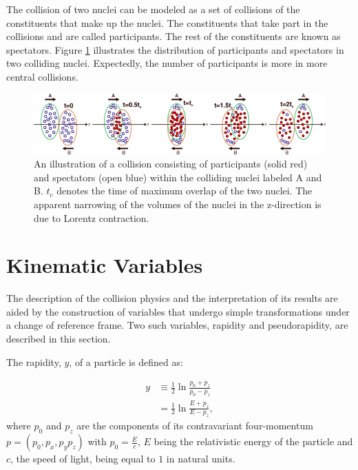 The collision of two nuclei can be modeled as a set of collisions of the constituents that make up the nuclei. The constituents that take part in the collisions and are called participants. The rest of the constituents are known as spectators. Figure \ref{fig:part_spec} illustrates the distribution of participants and spectators in two colliding nuclei. Expectedly, the number of participants is more in more central collisions.
\begin{figure}[h]
  \centering
  \includegraphics[width=6.5in]{figures/part_spec_Vovchenko.png}
  \caption{An illustration of a collision consisting of participants (solid red) and spectators (open blue) within the colliding nuclei labeled A and B. $t_{c}$ denotes the time of maximum overlap of the two nuclei. The apparent narrowing of the volumes of the nuclei in the z-direction is due to Lorentz contraction. \cite{PhysRevC.90.044907}}\label{fig:part_spec}
\end{figure}



\section{Kinematic Variables}
The description of the collision physics and the interpretation of its results are aided by the construction of variables that undergo simple transformations under a change of reference frame. Two such variables, rapidity and pseudorapidity, are described in this section.

The rapidity, $y$, of a particle is defined as:

	\begin{align}\label{def:rapidity}
	y &\equiv \frac{1}{2}\ln{\frac{p_{0} + p_{z}}{p_{0} - p_{z}}}\\
	&= \frac{1}{2}\ln{\frac{E + p_{z}}{E - p_{z}}},
	\end{align}
where $p_{0}$ and $p_{z}$ are the components of its contravariant four-momentum $p = (p_{0}, p_{x}, p_{y} p_{z})$ with $p_{0} = \frac{E}{c}$, $E$ being the relativistic energy of the particle and $c$, the speed of light, being equal to $1$ in natural units.


